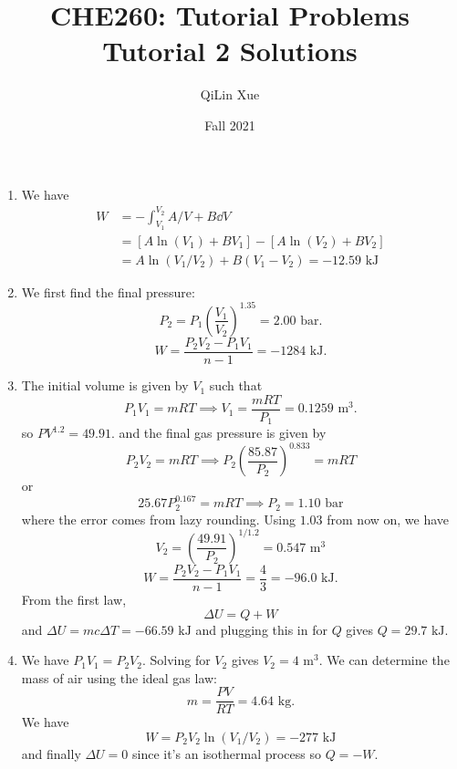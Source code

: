 \documentclass{article}
\title{CHE260: Tutorial Problems \\ \textbf{Tutorial 2 Solutions}}
\author{QiLin Xue}
\date{Fall 2021}
\begin{document}
\maketitle
\begin{enumerate}
    \item We have 
    \begin{align}
        W &= -\int_{V_1}^{V_2} A/V+B \dd{V} \\ 
        &= \left[A\ln(V_1)+BV_1\right] - \left[A\ln(V_2)+BV_2\right]  \\ 
        &= A\ln(V_1/V_2) + B(V_1-V_2) = -12.59\text{ kJ}
    \end{align}
    \item We first find the final pressure: 
    \begin{equation}
        P_2 = P_1\left(\frac{V_1}{V_2}\right)^{1.35} = 2.00\text{ bar.}
    \end{equation}
    \begin{equation}
        W = \frac{P_2V_2-P_1V_1}{n-1} = -1284\text{ kJ.}
    \end{equation}
    \item The initial volume is given by $V_1$ such that 
    \begin{equation}
        P_1V_1 = mRT \implies V_1 = \frac{mRT}{P_1} = 0.1259 \text{ m}^3. 
    \end{equation}
    so $PV^{1.2} = 49.91.$ 
    and the final gas pressure is given by 
    \begin{equation}
        P_2V_2 = mRT \implies P_2\left(\frac{85.87}{P_2}\right)^{0.833} = mRT
    \end{equation}
    or 
    \begin{equation}
        25.67P_2^{0.167}=mRT \implies P_2 = 1.10\text{ bar}
    \end{equation}
    where the error comes from lazy rounding. Using $1.03$ from now on, we have 
    \begin{equation}
        V_2 = \left(\frac{49.91}{P_2}\right)^{1/1.2}= 0.547\text{ m}^3
    \end{equation}
    \begin{equation}
        W = \frac{P_2V_2-P_1V_1}{n-1} = \frac{4}{3} = -96.0\text{ kJ.}
    \end{equation}
    From the first law,
    \begin{equation}
        \Delta U = Q + W
    \end{equation}
    and $\Delta U = mc\Delta T = -66.59 \text{ kJ}$ and plugging this in for $Q$ gives $Q = 29.7\text{ kJ}.$ 
    \item We have $P_1V_1 = P_2V_2.$ Solving for $V_2$ gives $V_2=4\text{ m}^3.$ We can determine the mass of air using the ideal gas law: 
    \begin{equation}
        m = \frac{PV}{RT} = 4.64\text{ kg}.
    \end{equation}
    We have
    \begin{equation}
        W = P_2V_2\ln(V_1/V_2) = -277\text{ kJ}
    \end{equation}
    and finally $\Delta U = 0$ since it's an isothermal process so $Q=-W.$ 
\end{enumerate}
\end{document}
